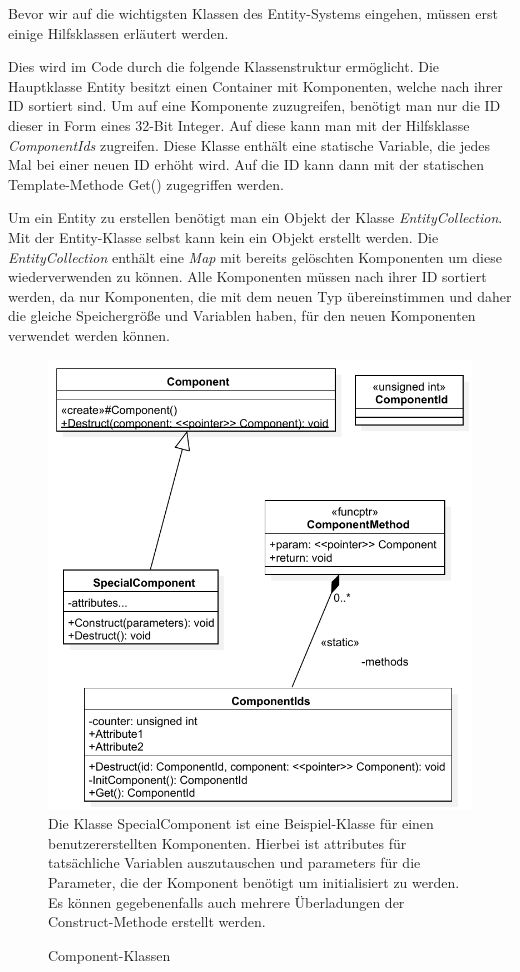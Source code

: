 Bevor wir auf die wichtigsten Klassen des Entity-Systems eingehen, müssen erst einige Hilfsklassen erläutert werden.

Dies wird im Code durch die folgende Klassenstruktur ermöglicht. Die Hauptklasse Entity besitzt einen Container mit Komponenten, welche nach ihrer ID sortiert sind. Um auf eine Komponente zuzugreifen, benötigt man nur die ID dieser in Form eines 32-Bit Integer. Auf diese kann man mit der Hilfsklasse \textit{ComponentIds} zugreifen. 
Diese Klasse enthält eine statische Variable, die jedes Mal bei einer neuen ID erhöht wird. Auf die ID kann dann mit der statischen Template-Methode Get() zugegriffen werden.
 
Um ein Entity zu erstellen benötigt man ein Objekt der Klasse \textit{EntityCollection}. Mit der Entity-Klasse selbst kann kein ein Objekt erstellt werden.  
Die \textit{EntityCollection} enthält eine \textit{Map} mit bereits gelöschten Komponenten um diese wiederverwenden zu können. 
Alle Komponenten müssen nach ihrer ID sortiert werden, da nur Komponenten, die mit dem neuen Typ übereinstimmen und daher die gleiche Speichergröße und Variablen haben, für den neuen Komponenten verwendet werden können.

\begin{figure}
	\begin{center}
		\includegraphics[width=\textwidth]{03unserprogramm/Engine/SpecialComponent.pdf}
		Die Klasse SpecialComponent ist eine Beispiel-Klasse für einen benutzererstellten Komponenten. Hierbei ist attributes für tatsächliche Variablen auszutauschen und parameters für die Parameter, die der Komponent benötigt um initialisiert zu werden. Es können gegebenenfalls auch mehrere Überladungen der Construct-Methode erstellt werden.
		\caption{Component-Klassen}\label{ClassDiagramComponents}
	\end{center}
\end{figure}

